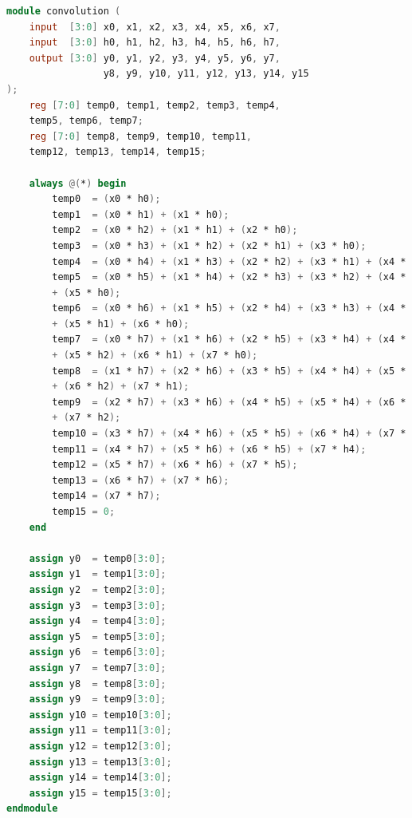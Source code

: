 \documentclass{article}
\begin{document}
\begin{tcolorbox}[title=Convolution Module Code, breakable]
\begin{lstlisting}[language=Verilog]
module convolution (
    input  [3:0] x0, x1, x2, x3, x4, x5, x6, x7,
    input  [3:0] h0, h1, h2, h3, h4, h5, h6, h7,
    output [3:0] y0, y1, y2, y3, y4, y5, y6, y7,
                 y8, y9, y10, y11, y12, y13, y14, y15
);
    reg [7:0] temp0, temp1, temp2, temp3, temp4, 
    temp5, temp6, temp7;
    reg [7:0] temp8, temp9, temp10, temp11, 
    temp12, temp13, temp14, temp15;

    always @(*) begin
        temp0  = (x0 * h0);
        temp1  = (x0 * h1) + (x1 * h0);
        temp2  = (x0 * h2) + (x1 * h1) + (x2 * h0);
        temp3  = (x0 * h3) + (x1 * h2) + (x2 * h1) + (x3 * h0);
        temp4  = (x0 * h4) + (x1 * h3) + (x2 * h2) + (x3 * h1) + (x4 * h0);
        temp5  = (x0 * h5) + (x1 * h4) + (x2 * h3) + (x3 * h2) + (x4 * h1) 
        + (x5 * h0);
        temp6  = (x0 * h6) + (x1 * h5) + (x2 * h4) + (x3 * h3) + (x4 * h2) 
        + (x5 * h1) + (x6 * h0);
        temp7  = (x0 * h7) + (x1 * h6) + (x2 * h5) + (x3 * h4) + (x4 * h3) 
        + (x5 * h2) + (x6 * h1) + (x7 * h0);
        temp8  = (x1 * h7) + (x2 * h6) + (x3 * h5) + (x4 * h4) + (x5 * h3) 
        + (x6 * h2) + (x7 * h1);
        temp9  = (x2 * h7) + (x3 * h6) + (x4 * h5) + (x5 * h4) + (x6 * h3) 
        + (x7 * h2);
        temp10 = (x3 * h7) + (x4 * h6) + (x5 * h5) + (x6 * h4) + (x7 * h3);
        temp11 = (x4 * h7) + (x5 * h6) + (x6 * h5) + (x7 * h4);
        temp12 = (x5 * h7) + (x6 * h6) + (x7 * h5);
        temp13 = (x6 * h7) + (x7 * h6);
        temp14 = (x7 * h7);
        temp15 = 0;
    end

    assign y0  = temp0[3:0];
    assign y1  = temp1[3:0];
    assign y2  = temp2[3:0];
    assign y3  = temp3[3:0];
    assign y4  = temp4[3:0];
    assign y5  = temp5[3:0];
    assign y6  = temp6[3:0];
    assign y7  = temp7[3:0];
    assign y8  = temp8[3:0];
    assign y9  = temp9[3:0];
    assign y10 = temp10[3:0];
    assign y11 = temp11[3:0];
    assign y12 = temp12[3:0];
    assign y13 = temp13[3:0];
    assign y14 = temp14[3:0];
    assign y15 = temp15[3:0];
endmodule
\end{lstlisting}
\end{tcolorbox} 
\end{document}
